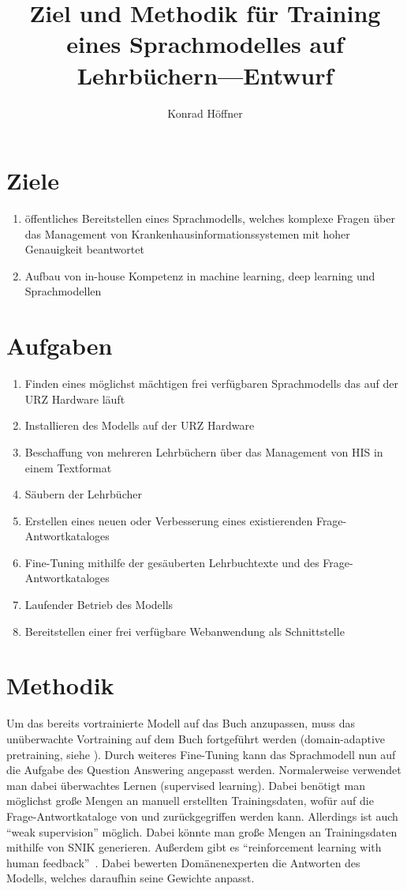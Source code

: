 \documentclass[a4paper]{article}
\author{Konrad Höffner}
\title{Ziel und Methodik für Training eines Sprachmodelles auf Lehrbüchern---Entwurf}
\theoremstyle{definition}
\begin{document}
\maketitle


\section{Ziele}
\begin{enumerate}
\item öffentliches Bereitstellen eines Sprachmodells, welches komplexe Fragen über das Management von Krankenhausinformationssystemen mit hoher Genauigkeit beantwortet
\item Aufbau von in-house Kompetenz in machine learning, deep learning und Sprachmodellen
\end{enumerate}

\section{Aufgaben}
\begin{enumerate}
\item Finden eines möglichst mächtigen frei verfügbaren Sprachmodells das auf der URZ Hardware läuft
\item Installieren des Modells auf der URZ Hardware
\item Beschaffung von mehreren Lehrbüchern über das Management von HIS in einem Textformat
\item Säubern der Lehrbücher
\item Erstellen eines neuen oder Verbesserung eines existierenden Frage-Antwortkataloges
\item Fine-Tuning mithilfe der gesäuberten Lehrbuchtexte und des Frage-Antwortkataloges
\item Laufender Betrieb des Modells
\item Bereitstellen einer frei verfügbare Webanwendung als Schnittstelle
\end{enumerate}

\section{Methodik}
Um das bereits vortrainierte Modell auf das Buch anzupassen, muss das unüberwachte Vortraining auf dem Buch fortgeführt werden (domain-adaptive pretraining, siehe \citet{pretraining}).
Durch weiteres Fine-Tuning kann das Sprachmodell nun auf die Aufgabe des Question Answering angepasst werden.
Normalerweise verwendet man dabei überwachtes Lernen (supervised learning\footnotemark{}).%
Dabei benötigt man möglichst große Mengen an manuell erstellten Trainingsdaten, wofür auf die Frage-Antwortkataloge von \citet{arneba} und \citet{hannesbell} zurückgegriffen werden kann.
Allerdings ist auch \enquote{weak supervision}\citep{weaksupervision} möglich.
Dabei könnte man große Mengen an Trainingsdaten mithilfe von SNIK generieren.
Außerdem gibt es \enquote{reinforcement learning with human feedback}~\citep{finetuninghuman}.
Dabei bewerten Domänenexperten die Antworten des Modells, welches daraufhin seine Gewichte anpasst.
\end{document}
